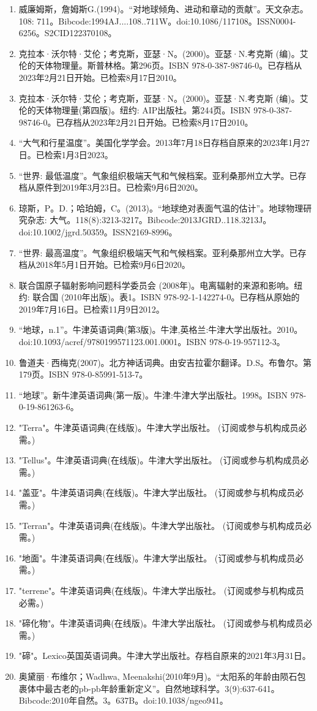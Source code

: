 \begin{enumerate}
\item 威廉姆斯，詹姆斯G.(1994)。“对地球倾角、进动和章动的贡献”。天文杂志。108: 711。Bibcode:1994AJ....108..711W。doi:10.1086/117108。ISSN0004-6256。S2CID122370108。  
\item 克拉本·沃尔特·艾伦；考克斯，亚瑟·N。(2000)。亚瑟·N.考克斯 (编)。艾伦的天体物理量。斯普林格。第296页。ISBN 978-0-387-98746-0。已存档从2023年2月21日开始。已检索8月17日2010。
\item 克拉本·沃尔特·艾伦；考克斯，亚瑟·N。(2000)。亚瑟·N.考克斯 (编)。艾伦的天体物理量(第四版)。纽约: AIP出版社。第244页。ISBN 978-0-387-98746-0。已存档从2023年2月21日开始。已检索8月17日2010。
\item “大气和行星温度”。美国化学学会。2013年7月18日存档自原来的2023年1月27日。已检索1月3日2023。
\item “世界: 最低温度”。气象组织极端天气和气候档案。亚利桑那州立大学。已存档从原件到2019年3月23日。已检索9月6日2020。
\item 琼斯，P。D.；哈珀姆，C。(2013)。“地球绝对表面气温的估计”。地球物理研究杂志: 大气。118(8):3213-3217。Bibcode:2013JGRD..118.3213J。doi:10.1002/jgrd.50359。ISSN2169-8996。 
\item “世界: 最高温度”。气象组织极端天气和气候档案。亚利桑那州立大学。已存档从2018年5月1日开始。已检索9月6日2020。
\item 联合国原子辐射影响问题科学委员会 (2008年)。电离辐射的来源和影响。纽约: 联合国 (2010年出版)。表1。ISBN 978-92-1-142274-0。已存档从原始的2019年7月16日。已检索11月9日2012。
\item “地球，n.1”。牛津英语词典(第3版)。牛津,英格兰:牛津大学出版社。2010。doi:10.1093/acref/9780199571123.001.0001。ISBN 978-0-19-957112-3。
\item 鲁道夫·西梅克(2007)。北方神话词典。由安吉拉霍尔翻译。D.S。布鲁尔。第179页。ISBN 978-0-85991-513-7。
\item “地球”。新牛津英语词典(第一版)。牛津:牛津大学出版社。1998。ISBN 978-0-19-861263-6。
\item "Terra"。牛津英语词典(在线版)。牛津大学出版社。 (订阅或参与机构成员必需。)
\item "Tellus"。牛津英语词典(在线版)。牛津大学出版社。 (订阅或参与机构成员必需。)
\item "盖亚"。牛津英语词典(在线版)。牛津大学出版社。 (订阅或参与机构成员必需。)
\item "Terran"。牛津英语词典(在线版)。牛津大学出版社。 (订阅或参与机构成员必需。)
\item "地面"。牛津英语词典(在线版)。牛津大学出版社。 (订阅或参与机构成员必需。)
\item "terrene"。牛津英语词典(在线版)。牛津大学出版社。 (订阅或参与机构成员必需。)
\item "碲化物"。牛津英语词典(在线版)。牛津大学出版社。 (订阅或参与机构成员必需。)
\item "碲"。Lexico英国英语词典。牛津大学出版社。存档自原来的2021年3月31日。
\item 奥黛丽·布维尔；Wadhwa, Meenakshi(2010年9月)。“太阳系的年龄由陨石包裹体中最古老的pb-pb年龄重新定义”。自然地球科学。3(9):637-641。Bibcode:2010年自然。3。637B。doi:10.1038/ngeo941。
 \end{enumerate}